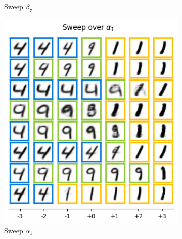 \begin{figure}[h]
\begin{subfigure}[t]{.23\linewidth}
        \caption{Sweep $\beta_7$}
    \end{subfigure}
    \caption{Visualizations of learned latent factors for MNIST classifier trained on classes '3' \& '8'}
    \label{fig:complte_:mnist_results 38}

    \begin{subfigure}[t]{.23\linewidth}
        \includegraphics[width=.9\textwidth]{openreview/pictures/Figure13/alpha_1.png}
        \caption{Sweep $\alpha_1$}
    \end{subfigure}
     \begin{subfigure}[t]{.23\linewidth}

\end{subfigure}
\end{figure}
